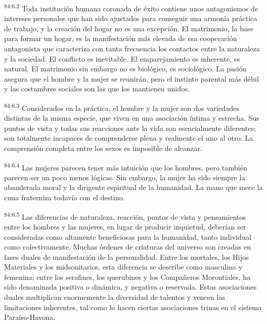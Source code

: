 \par
\textsuperscript{84:6.2} Toda institución humana coronada de éxito contiene unos antagonismos de intereses personales que han sido ajustados para conseguir una armonía práctica de trabajo, y la creación del hogar no es una excepción. El matrimonio, la base para formar un hogar, es la manifestación más elevada de esa cooperación antagonista que caracteriza con tanta frecuencia los contactos entre la naturaleza y la sociedad. El conflicto es inevitable. El emparejamiento es inherente, es natural. El matrimonio sin embargo no es biológico, es sociológico. La pasión asegura que el hombre y la mujer se reunirán, pero el instinto parental más débil y las costumbres sociales son las que los mantienen unidos.

\par
\textsuperscript{84:6.3} Considerados en la práctica, el hombre y la mujer son dos variedades distintas de la misma especie, que viven en una asociación íntima y estrecha. Sus puntos de vista y todas sus reacciones ante la vida son esencialmente diferentes; son totalmente incapaces de comprenderse plena y realmente el uno al otro. La comprensión completa entre los sexos es imposible de alcanzar.

\par
\textsuperscript{84:6.4} Las mujeres parecen tener más intuición que los hombres, pero también parecen ser un poco menos lógicas. Sin embargo, la mujer ha sido siempre la abanderada moral y la dirigente espiritual de la humanidad. La mano que mece la cuna fraterniza todavía con el destino.

\par
\textsuperscript{84:6.5} Las diferencias de naturaleza, reacción, puntos de vista y pensamientos entre los hombres y las mujeres, en lugar de producir inquietud, deberían ser consideradas como altamente beneficiosas para la humanidad, tanto individual como colectivamente. Muchas órdenes de criaturas del universo son creadas en fases duales de manifestación de la personalidad. Entre los mortales, los Hijos Materiales y los midsonitarios, esta diferencia se describe como masculina y femenina; entre los serafines, los querubines y los Compañeros Morontiales, ha sido denominada positiva o dinámica, y negativa o reservada. Estas asociaciones duales multiplican enormemente la diversidad de talentos y vencen las limitaciones inherentes, tal como lo hacen ciertas asociaciones trinas en el sistema Paraíso-Havona.

